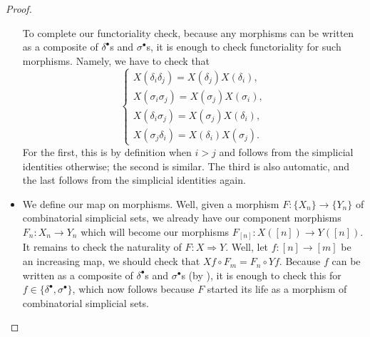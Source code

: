 \documentclass[../notes.tex]{subfiles}
\begin{document}
\begin{proof}
\begin{itemize}
		To complete our functoriality check, because any morphisms can be written as a composite of $\delta^\bullet$s and $\sigma^\bullet$s, it is enough to check functoriality for such morphisms. Namely, we have to check that
		\[\begin{cases}
			X(\delta_i\delta_j)=X(\delta_j)X(\delta_i), \\
			X(\sigma_i\sigma_j)=X(\sigma_j)X(\sigma_i), \\
			X(\delta_i\sigma_j)=X(\sigma_j)X(\delta_i), \\
			X(\sigma_j\delta_i)=X(\delta_i)X(\sigma_j).
		\end{cases}\]
		For the first, this is by definition when $i>j$ and follows from the simplicial identities otherwise; the second is similar. The third is also automatic, and the last follows from the simplicial identities again.

		\item We define our map  on morphisms. Well, given a morphism $F\colon\{X_n\}\to\{Y_n\}$ of combinatorial simplicial sets, we already have our component morphisms $F_n\colon X_n\to Y_n$ which will become our morphisms $F_{[n]}\colon X([n])\to Y([n])$. It remains to check the naturality of $F\colon X\Rightarrow Y$. Well, let $f\colon[n]\to[m]$ be an increasing map, we should check that $Xf\circ F_m=F_n\circ Yf$. Because $f$ can be written as a composite of $\delta^\bullet$s and $\sigma^\bullet$s (by ), it is enough to check this for $f\in\{\delta^\bullet,\sigma^\bullet\}$, which now follows because $F$ started its life as a morphism of combinatorial simplicial sets.


\end{itemize}
\end{proof}
\end{document}
